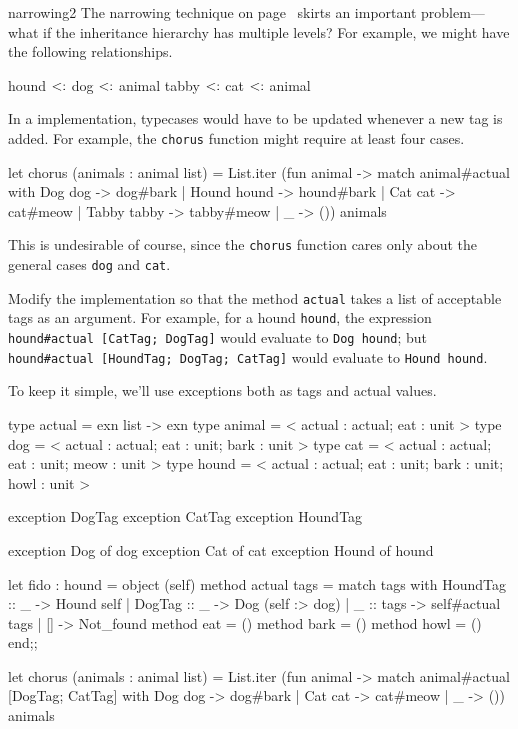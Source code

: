 \begin{exercise}{narrowing2}
The narrowing technique on page~\pageref{page:narrowing-with-exceptions} skirts an important
problem---what if the inheritance hierarchy has multiple levels?  For example, we might have the
following relationships.

\begin{ocaml}
hound $\mathrel{\hbox{<:}}$ dog $\mathrel{\hbox{<:}}$ animal
tabby $\mathrel{\hbox{<:}}$ cat $\mathrel{\hbox{<:}}$ animal
\end{ocaml}
%
In a  implementation, typecases would have to be updated whenever a new tag is added.  For example, the
\hbox{\lstinline/chorus/} function might require at least four cases.

\begin{ocaml}
let chorus (animals : animal list) =
   List.iter (fun animal ->
      match animal#actual with
         Dog dog -> dog#bark
       | Hound hound -> hound#bark
       | Cat cat -> cat#meow
       | Tabby tabby -> tabby#meow
       | _ -> ()) animals
\end{ocaml}
%
This is undesirable of course, since the \hbox{\lstinline/chorus/} function cares only about the general
cases \hbox{\lstinline/dog/} and \hbox{\lstinline/cat/}.

Modify the implementation so that the method \hbox{\lstinline/actual/} takes a list of acceptable tags as
an argument.  For example, for a hound \hbox{\lstinline/hound/}, the expression
\hbox{\lstinline/hound#actual [CatTag; DogTag]/} would evaluate to \hbox{\lstinline/Dog hound/};
but \hbox{\lstinline/hound#actual [HoundTag; DogTag; CatTag]/} would evaluate to \hbox{\lstinline/Hound hound/}.

\begin{answer}\ifanswers
To keep it simple, we'll use exceptions both as tags and actual values.

\begin{ocaml}
type actual = exn list -> exn
type animal = < actual : actual; eat : unit >
type dog = < actual : actual; eat : unit; bark : unit >
type cat = < actual : actual; eat : unit; meow : unit >
type hound = < actual : actual; eat : unit; bark : unit; howl : unit >

exception DogTag
exception CatTag
exception HoundTag

exception Dog of dog
exception Cat of cat
exception Hound of hound

let fido : hound =
object (self)
   method actual tags =
      match tags with
         HoundTag :: _ -> Hound self
       | DogTag :: _ -> Dog (self :> dog)
       | _ :: tags -> self#actual tags
       | [] -> Not_found
   method eat = ()
   method bark = ()
   method howl = ()
end;;

let chorus (animals : animal list) =
   List.iter (fun animal ->
      match animal#actual [DogTag; CatTag] with
         Dog dog -> dog#bark
       | Cat cat -> cat#meow
       | _ -> ()) animals
\end{ocaml}
\fi\end{answer}
\end{exercise}

